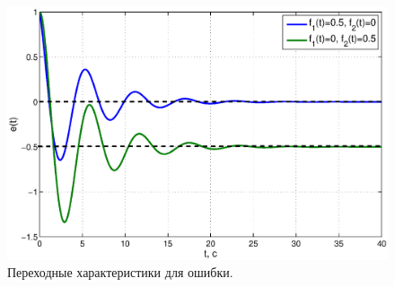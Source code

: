 \documentclass[12pt,a4paper]{article}
\begin{document}
\begin{figure}[H]
    \centering
    \includegraphics[width=1\linewidth]{3.2.eps}
    \caption{Переходные характеристики для ошибки.}
\end{figure}
\end{document}
